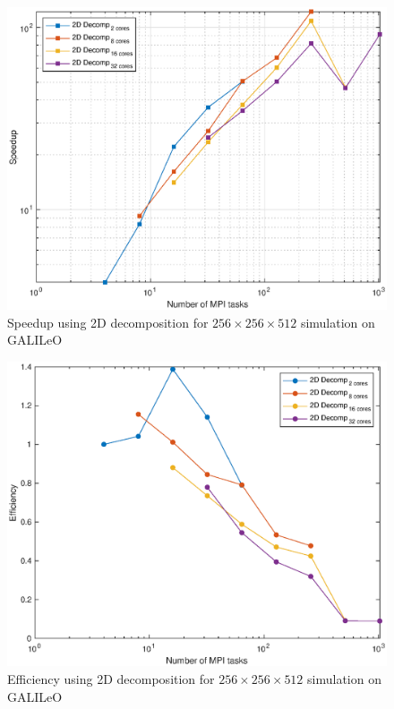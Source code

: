 \begin{figure}
\begin{center}
\includegraphics[scale=0.55]{grafici/galileo_speedup}
\caption{Speedup using 2D decomposition for $256\times 256\times 512$ simulation on GALILeO}
\label{galileo:speedup}
\end{center}
\end{figure}

\begin{figure}
\begin{center}
\includegraphics[scale=0.55]{grafici/galileo_efficiency}
\caption{Efficiency using 2D decomposition for $256\times 256\times 512$ simulation on GALILeO}
\label{galileo:efficiency}
\end{center}
\end{figure}


